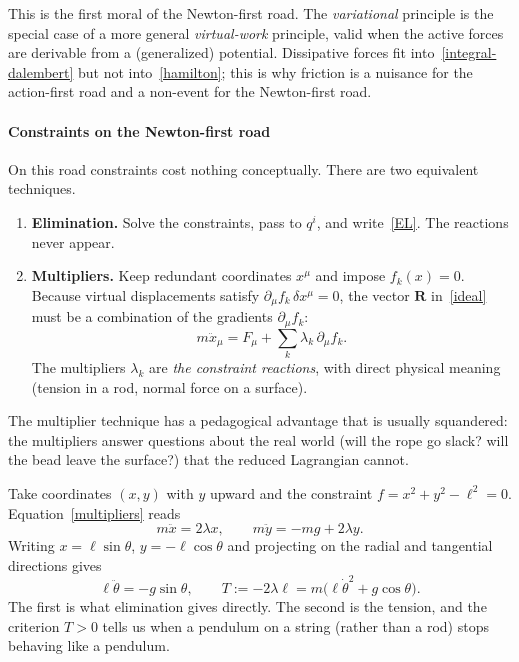 This is the first moral of the Newton-first road. The \emph{variational}
principle is the special case of a more general \emph{virtual-work}
principle, valid when the active forces are derivable from a (generalized)
potential. Dissipative forces fit into~\eqref{integral-dalembert} but not
into~\eqref{hamilton}; this is why friction is a nuisance for the
action-first road and a non-event for the Newton-first road.

\paragraph{Constraints on the Newton-first road}

On this road constraints cost nothing conceptually. There are two equivalent
techniques.

\begin{enumerate}
  \item \textbf{Elimination.} Solve the constraints, pass to $q^i$,
  and write~\eqref{EL}. The reactions never appear.
  \item \textbf{Multipliers.} Keep redundant coordinates $x^\mu$ and impose
  $f_k(x)=0$. Because virtual displacements satisfy
  $\partial_\mu f_k\,\delta x^\mu=0$, the vector $\mathbf R$ in~\eqref{ideal}
  must be a combination of the gradients $\partial_\mu f_k$:
  \begin{equation}
    m\ddot x_\mu=F_\mu+\sum_k\lambda_k\,\partial_\mu f_k .
    \label{multipliers}
  \end{equation}
  The multipliers $\lambda_k$ are \emph{the constraint reactions}, with direct
  physical meaning (tension in a rod, normal force on a surface).
\end{enumerate}

The multiplier technique has a pedagogical advantage that is usually
squandered: the multipliers answer questions about the real world
(will the rope go slack? will the bead leave the surface?) that the reduced
Lagrangian cannot.

\begin{example}\label{pendulum}
Take coordinates $(x,y)$ with $y$ upward and the constraint
$f=x^2+y^2-\ell^2=0$. Equation~\eqref{multipliers} reads
\[
  m\ddot x=2\lambda x,\qquad m\ddot y=-mg+2\lambda y .
\]
Writing $x=\ell\sin\theta$, $y=-\ell\cos\theta$ and projecting on the radial
and tangential directions gives
\[
  \ell\ddot\theta=-g\sin\theta,\qquad
  T:=-2\lambda\ell=m\bigl(\ell\dot\theta^{2}+g\cos\theta\bigr).
\]
The first is what elimination gives directly. The second is the tension, and
the criterion $T>0$ tells us when a pendulum on a string (rather than a rod)
stops behaving like a pendulum.
\end{example}

